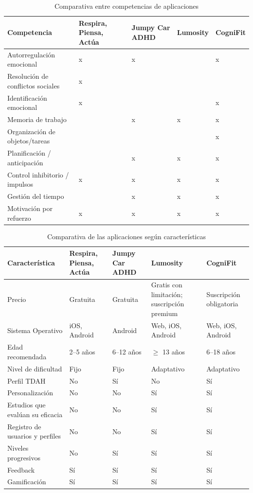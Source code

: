 \begin{table}[H]
\centering
\begin{tabularx}{\textwidth}{|X|X|X|X|X|}
    \hline
    \textbf{Competencia} & \textbf{Respira, Piensa, Actúa} & \textbf{Jumpy Car ADHD} & \textbf{Lumosity} & \textbf{CogniFit}\\
    \hline
    Autorregulación emocional         & x & x &   & x \\
    \hline
    Resolución de conflictos sociales & x &   &   &   \\
    \hline
    Identificación emocional          & x &   &   & x \\
    \hline
    Memoria de trabajo                &   & x & x & x \\
    \hline
    Organización de objetos/tareas    &   &   &   & x \\
    \hline
    Planificación / anticipación      &   & x & x & x \\
    \hline
    Control inhibitorio / impulsos    & x & x & x & x \\
    \hline
    Gestión del tiempo                &   & x & x & x \\
    \hline
    Motivación por refuerzo           & x & x & x & x \\
    \hline
\end{tabularx}
\caption{Comparativa entre competencias de aplicaciones}
\label{tab:comparativa_competencias}
\end{table}

\begin{table}[H]
\centering
\begin{tabularx}{\textwidth}{|X|X|X|X|X|}
    \hline
    \textbf{Característica} & \textbf{Respira, Piensa, Actúa} & \textbf{Jumpy Car ADHD} & \textbf{Lumosity} & \textbf{CogniFit} \\
    \hline
    Precio & Gratuita & Gratuita & Gratis con limitación; suscripción premium & Suscripción obligatoria \\
    \hline
    Sistema Operativo & iOS, Android & Android & Web, iOS, Android & Web, iOS, Android \\
    \hline
    Edad recomendada & 2–5 años & 6–12 años & $\ge$ 13 años & 6–18 años \\
    \hline
    Nivel de dificultad & Fijo & Fijo & Adaptativo & Adaptativo \\
    \hline
    Perfil TDAH & No & Sí & No & Sí \\
    \hline
    Personalización & No & No & Sí & Sí \\
    \hline
    Estudios que evalúan su eficacia & No & No & Sí & Sí \\
    \hline
    Registro de usuarios y perfiles & No & No & Sí & Sí \\
    \hline
    Niveles progresivos & No & Sí & Sí & Sí \\
    \hline
    Feedback & Sí & Sí & Sí & Sí \\
    \hline
    Gamificación & Sí & Sí & Sí & Sí \\
    \hline
\end{tabularx}
\caption{Comparativa de las aplicaciones según características}
\label{tab:comparativa_caracteristicas}
\end{table}

